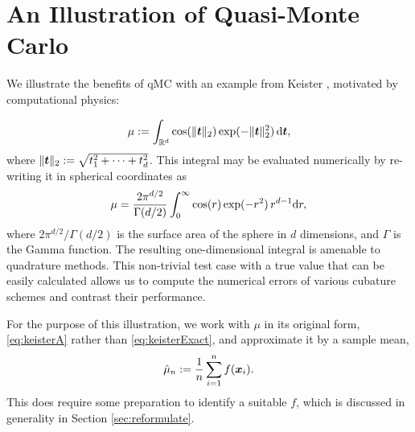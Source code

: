 \documentclass{svproc}
\begin{document}
%
\section{An Illustration of Quasi-Monte Carlo} \label{sec:practice}

We illustrate the benefits of qMC with an example from Keister \cite{Kei96}, motivated by computational physics:

\begin{equation}\label{eq:keisterA}
	\mu := \int_{\mathbb{R}^d} \cos(\lVert {\boldsymbol{t}} \rVert_2) \exp(-\lVert {\boldsymbol{t}} \rVert_2^2) \, {\mathrm{d}} {\boldsymbol{t}},
\end{equation}
where $\lVert {\boldsymbol{t}} \rVert_2 := \sqrt{t_1^2 + \cdots + t_d^2}$.  This integral may be evaluated numerically by re-writing it in spherical coordinates as
\begin{equation}\label{eq:keisterExact}
	\mu = \frac{2 \pi^{d/2}}{\Gamma(d/2)}\int_{0}^{\infty} \cos(r) \exp(-r^2) \, r^{d-1} {\mathrm{d}} r,
\end{equation}
where $2 \pi^{d/2}/\Gamma(d/2)$ is the surface area of the sphere in $d$ dimensions, and $\Gamma$ is the Gamma function.  The resulting one-dimensional integral is amenable to quadrature methods.  This non-trivial test case with a true value that can be easily calculated allows us to compute the numerical errors of various cubature schemes and contrast their performance.

For the purpose of this illustration, we work with $\mu$ in its original form, \eqref{eq:keisterA} rather than \eqref{eq:keisterExact}, and approximate it by a sample mean,
\begin{equation} \label{eq:sample_mean}
	\hat{\mu}_n := \frac 1n \sum_{i=1}^n f({\boldsymbol{x}}_i).
\end{equation}
This does require some preparation to identify a suitable $f$, which is discussed in generality in Section \ref{sec:reformulate}.
\end{document}
